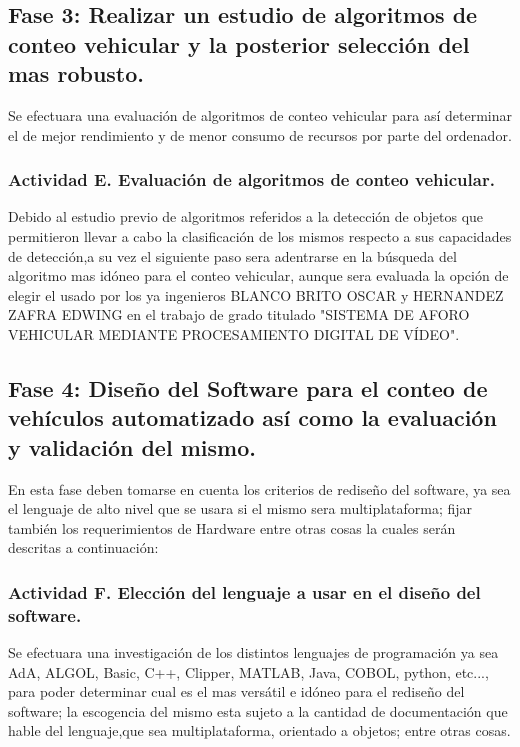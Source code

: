 \subsection{Fase 3: Realizar  un estudio de algoritmos de conteo vehicular y la posterior selección del mas robusto.}
Se efectuara una evaluación de algoritmos de conteo vehicular para así determinar el de mejor rendimiento y de menor consumo de recursos por parte del ordenador.

\subsubsection{Actividad E. Evaluación de algoritmos de conteo vehicular.}

Debido al estudio previo de algoritmos referidos a la detección de objetos que permitieron llevar a cabo la clasificación de los mismos respecto a sus capacidades de detección,a su vez el siguiente paso sera adentrarse en la búsqueda del algoritmo mas idóneo para el conteo vehicular, aunque sera evaluada la opción de elegir el usado por los ya ingenieros BLANCO BRITO OSCAR y HERNANDEZ ZAFRA EDWING en el trabajo de grado titulado "SISTEMA DE AFORO VEHICULAR MEDIANTE PROCESAMIENTO DIGITAL DE VÍDEO".


\subsection{Fase 4: Diseño del Software para el conteo de vehículos automatizado así como la evaluación y validación del mismo.}

En esta fase deben tomarse en cuenta los criterios de rediseño del software, ya sea el lenguaje de alto nivel que se usara si el mismo sera multiplataforma; fijar también los requerimientos de Hardware entre otras cosas la cuales serán descritas a continuación:

\subsubsection{Actividad F. Elección del lenguaje a usar en el diseño del software. }

Se efectuara una investigación de los distintos lenguajes de programación ya sea AdA, ALGOL, Basic, C++, Clipper, MATLAB, Java, COBOL, python, etc..., para poder determinar cual es el mas versátil e idóneo para el rediseño del software; la escogencia del mismo esta sujeto a la cantidad de documentación que hable del lenguaje,que sea multiplataforma, orientado a objetos; entre otras cosas.

